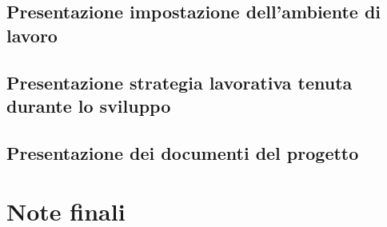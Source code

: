 \documentclass[hidelinks,12pt,a4paper]{article}
\begin{document}
\begin{flushleft}
			\subsection{Presentazione impostazione dell'ambiente di lavoro}
			\subsection{Presentazione strategia lavorativa tenuta durante lo sviluppo}
			\subsection{Presentazione dei documenti del progetto}
		
		\section{Note finali}
		
	\end{flushleft}
\end{document}
